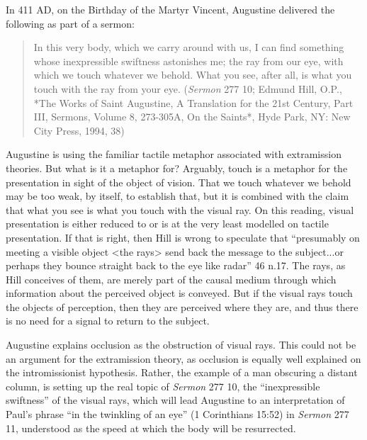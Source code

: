 \documentclass[12pt]{article}
\begin{document}
In 411 AD, on the Birthday of the Martyr Vincent, Augustine delivered the following as part of a sermon:
\begin{quote}
	In this very body, which we carry around with us, I can find something whose inexpressible swiftness astonishes me; the ray from our eye, with which we touch whatever we behold. What you see, after all, is what you touch with the ray from your eye. (\emph{Sermon} 277 10; Edmund Hill, O.P., *The Works of Saint Augustine, A Translation for the 21st Century, Part III, Sermons, Volume 8, 273-305A, On the Saints*, Hyde Park, NY: New City Press, 1994, 38)
\end{quote}
Augustine is using the familiar tactile metaphor associated with extramission theories. But what is it a metaphor for? Arguably, touch is a metaphor for the presentation in sight of the object of vision. That we touch whatever we behold may be too weak, by itself, to establish that, but it is combined with the claim that what you see is what you touch with the visual ray. On this reading, visual presentation is either reduced to or is at the very least modelled on tactile presentation. If that is right, then Hill is wrong to speculate that ``presumably on meeting a visible object <the rays> send back the message to the subject...or perhaps they bounce straight back to the eye like radar'' 46 n.17. The rays, as Hill conceives of them, are merely part of the causal medium through which information about the perceived object is conveyed. But if the visual rays touch the objects of perception, then they are perceived where they are, and thus there is no need for a signal to return to the subject.

Augustine explains occlusion as the obstruction of visual rays. This could not be an argument for the extramission theory, as occlusion is equally well explained on the intromissionist hypothesis. Rather, the example of a man obscuring a distant column, is setting up the real topic of \emph{Sermon} 277 10, the ``inexpressible swiftness'' of the visual rays, which will lead Augustine to an interpretation of Paul's phrase ``in the twinkling of an eye'' (1 Corinthians 15:52) in \emph{Sermon} 277 11, understood as the speed at which the body will be resurrected.
\end{document}
